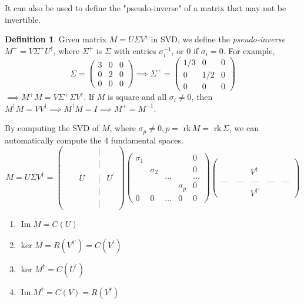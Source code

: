 \documentclass{article}
\DeclareMathOperator{\im}{Im}
\theoremstyle{remark}
\theoremstyle{definition}
\newtheorem{definition}{Definition}[section]
\begin{document}
It can also be used to define the "pseudo-inverse" of a matrix that may not be invertible. 

\begin{definition}
Given matrix $M = U \Sigma V^\dagger$ in SVD, we define the \textit{pseudo-inverse} $M^+ = V \Sigma^+ U^\dagger$, where $\Sigma^+$ is $\Sigma$ with entries $\sigma_i^{-1}$, or $0$ if $\sigma_i = 0$. For example,
\[ \Sigma = \begin{pmatrix}3&0&0\\0&2&0\\0&0&0\end{pmatrix} \implies \Sigma^+ = \begin{pmatrix}1/3&0&0\\0&1/2&0\\0&0&0\end{pmatrix}\]
$\implies M^+ M = V \Sigma^+ \Sigma V^\dagger$. If $M$ is square and all $\sigma_i \neq 0$, then $M^\dagger M = V V^\dagger \implies M^\dagger M = I \implies  M^+ = M^{-1}$. 
\end{definition}

By computing the SVD of $M$, where $\sigma_p \neq 0, p =$ rk$\,M = $ rk$\,\Sigma$, we can automatically compute the 4 fundamental spaces. 
\[M = U \Sigma V^\dagger = \begin{pmatrix}&&&&|&\\&&&&|&\\&&U&&|&U^\prime\\&&&&|&\\&&&&|&
\end{pmatrix} \begin{pmatrix}
\sigma_1&&&&0\\
&\sigma_2&&&0\\
&&...&&...\\
&&&\sigma_p&0\\
0&0&...&0&0
\end{pmatrix}\begin{pmatrix}
&&&&\\&&&&\\&&V^\dagger&&\\&&&&\\\text{---}&\text{---}&\text{---}&\text{---}&\text{---}
\\&&V^{\dagger \prime}&&
\end{pmatrix}\]
\begin{enumerate}
    \item $\im{M} = C(U)$
    \item $\ker{M} = R(V^{\dagger \prime}) = C(V^\prime)$
    \item $\ker{M^\dagger} = C(U^\prime)$
    \item $\im{M^\dagger} = C(V) = R(V^\dagger)$
\end{enumerate}
\end{document}

